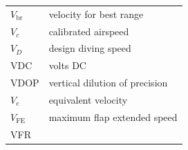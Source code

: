 \documentclass[
]{book}
\begin{document}
\begin{longtable}[]{@{}ll@{}}
\begin{minipage}[t]{0.47\columnwidth}
\(V_{\mathrm{br}}\)\strut
\end{minipage} & \begin{minipage}[t]{0.47\columnwidth}\raggedright
velocity for best range\strut
\end{minipage}\tabularnewline
\begin{minipage}[t]{0.47\columnwidth}\raggedright
\(V_c\)\strut
\end{minipage} & \begin{minipage}[t]{0.47\columnwidth}\raggedright
calibrated airspeed\strut
\end{minipage}\tabularnewline
\begin{minipage}[t]{0.47\columnwidth}\raggedright
\(V_D\)\strut
\end{minipage} & \begin{minipage}[t]{0.47\columnwidth}\raggedright
design diving speed\strut
\end{minipage}\tabularnewline
\begin{minipage}[t]{0.47\columnwidth}\raggedright
VDC\strut
\end{minipage} & \begin{minipage}[t]{0.47\columnwidth}\raggedright
volts DC\strut
\end{minipage}\tabularnewline
\begin{minipage}[t]{0.47\columnwidth}\raggedright
VDOP\strut
\end{minipage} & \begin{minipage}[t]{0.47\columnwidth}\raggedright
vertical dilution of precision\strut
\end{minipage}\tabularnewline
\begin{minipage}[t]{0.47\columnwidth}\raggedright
\(V_e\)\strut
\end{minipage} & \begin{minipage}[t]{0.47\columnwidth}\raggedright
equivalent velocity\strut
\end{minipage}\tabularnewline
\begin{minipage}[t]{0.47\columnwidth}\raggedright
\(V_{\mathrm{FE}}\)\strut
\end{minipage} & \begin{minipage}[t]{0.47\columnwidth}\raggedright
maximum flap extended speed\strut
\end{minipage}\tabularnewline
\begin{minipage}[t]{0.47\columnwidth}\raggedright
VFR\strut
\end{minipage} & \begin{minipage}[t]{0.47\columnwidth}\raggedright

\end{minipage}
\end{longtable}
\end{document}
